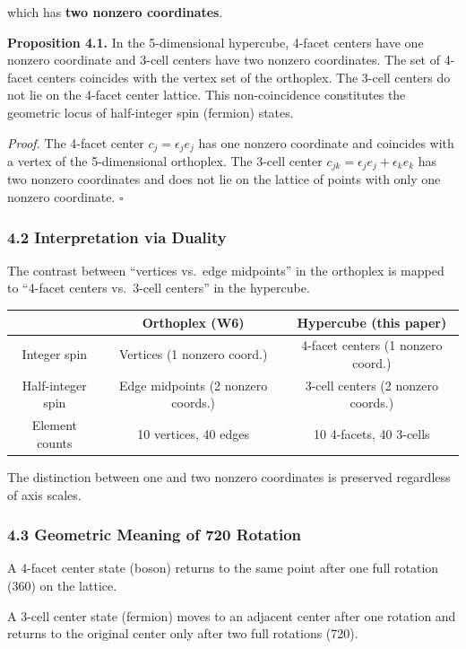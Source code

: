\documentclass[a4paper,11pt]{article}
\newcounter{none}
\begin{document}
which has \textbf{two nonzero coordinates}.

\textbf{Proposition 4.1.} In the 5-dimensional hypercube, 4-facet centers have one nonzero coordinate and 3-cell centers have two nonzero coordinates. The set of 4-facet centers coincides with the vertex set of the orthoplex. The 3-cell centers do not lie on the 4-facet center lattice. This non-coincidence constitutes the geometric locus of half-integer spin (fermion) states.

\emph{Proof.} The 4-facet center $c_j = \epsilon_j e_j$ has one nonzero coordinate and coincides with a vertex of the 5-dimensional orthoplex. The 3-cell center $c_{jk} = \epsilon_j e_j + \epsilon_k e_k$ has two nonzero coordinates and does not lie on the lattice of points with only one nonzero coordinate. $\square$

\subsubsection*{4.2 Interpretation via Duality}

The contrast between ``vertices vs.\ edge midpoints'' in the orthoplex is mapped to ``4-facet centers vs.\ 3-cell centers'' in the hypercube.

{\def\LTcaptype{none}
\begin{longtable}[]{@{}ccc@{}}
\toprule
& Orthoplex (W6) & Hypercube (this paper) \\
\midrule
\endhead
\bottomrule
\endlastfoot
Integer spin & Vertices (1 nonzero coord.) & 4-facet centers (1 nonzero coord.) \\
Half-integer spin & Edge midpoints (2 nonzero coords.) & 3-cell centers (2 nonzero coords.) \\
Element counts & 10 vertices, 40 edges & 10 4-facets, 40 3-cells \\
\end{longtable}
}

The distinction between one and two nonzero coordinates is preserved regardless of axis scales.

\subsubsection*{4.3 Geometric Meaning of 720\textdegree{} Rotation}

A 4-facet center state (boson) returns to the same point after one full rotation (360\textdegree) on the lattice.

A 3-cell center state (fermion) moves to an adjacent center after one rotation and returns to the original center only after two full rotations (720\textdegree).
\end{document}
